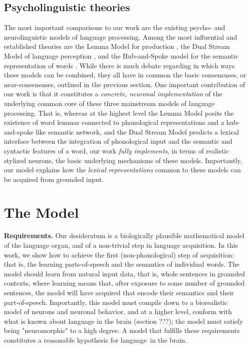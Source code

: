 \documentclass{article}
\begin{document}
\subsection*{Psycholinguistic theories}
The most important comparisons to our work are the existing psycho- and neurolinguistic models of language processing. Among the most influential and established theories are the Lemma Model for production \cite{LeveltLemma}, the Dual Stream Model of language perception \cite{HickockPoeppel}, and the Hub-and-Spoke model for the semantic representation of words \cite{RalphHubSpoke}. While there is much debate regarding in which ways these models can be combined, they all have in common the basic consensuses, or near-consensuses, outlined in the previous section. One important contribution of our work is that it constitutes a \emph{concrete, neuronal implementation} of the underlying common core of these three mainstream models of language processing. That is, whereas at the highest level the Lemma Model posits the existence of word lemmas connected to phonological representations and a hub-and-spoke like semantic network, and the Dual Stream Model predicts a lexical interface between the integration of phonological input and the semantic and syntactic features of a word, our work \emph{fully implements}, in terms of realistic stylized neurons, the basic underlying mechanisms of these models. Importantly, our model explains how the \emph{lexical representations} common to these models can be acquired from grounded input. 
\iffalse

\section{The Model} \label{model}
\textbf{Requirements.} Our desideratum is a biologically plausible mathematical model of the language organ, and of a non-trivial step in language acquisition. In this work, we show how to achieve the first (non-phonological) step of acquisition: that is, the learning parts-of-speech and the semantics of individual words. The model should learn from natural input data, that is, whole sentences in grounded contexts, where learning means that, after exposure to some number of grounded sentences, the model will have acquired  that encode their semantics and their part-of-speech. Importantly, this model must compile down to a biorealistic model of neurons and neuronal behavior, and at a higher level, conform with what is known about language in the brain (section ???); the model must satisfy being "neuromorphic" to a high degree. A model that fulfills these requirements constitutes a reasonable hypothesis for language in the brain.
\end{document}
